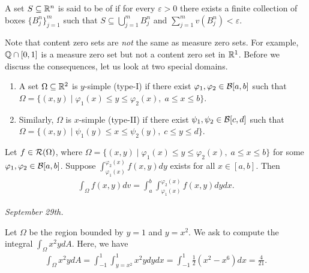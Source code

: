 \begin{definition}
    A set $S \subseteq \mathbb{R}^{n}$ is said to be of  if for every $\varepsilon > 0$ there exists a finite collection of boxes $\{B_{j}^{n}\}_{j = 1}^{m}$ such that $S \subseteq \bigcup_{j=1}^{m} B_{j}^{n}$ and $\sum_{j=1}^{m} v(B_{j}^{n}) < \varepsilon$.
\end{definition}

Note that content zero sets are \textit{not} the same as measure zero sets. For example, $\mathbb{Q} \cap [0,1]$ is a measure zero set but not a content zero set in $\mathbb{R}^{1}$. Before we discuss the consequences, let us look at two special domains.

\begin{enumerate}
    \item A set $\Omega \subseteq \mathbb{R}^{2}$ is $y$-simple (type-I) if there exist $\varphi_{1},\varphi_{2} \in \mathcal{B}[a,b]$ such that $\Omega = \{(x,y) \mid \varphi_{1}(x) \leq y \leq \varphi_{2}(x),\; a \leq x \leq b\}$. 
    \item Similarly, $\Omega$ is $x$-simple (type-II) if there exist $\psi_{1},\psi_{2} \in \mathcal{B}[c,d]$ such that $\Omega = \{(x,y) \mid \psi_{1}(y) \leq x \leq \psi_{2}(y),\; c \leq y \leq d\}$.
\end{enumerate}

\begin{theorem}
    Let $f \in \mathcal{R}(\Omega)$, where $\Omega = \{(x,y) \mid \varphi_{1}(x) \leq y \leq \varphi_{2}(x),\;a \leq x \leq b\}$ for some $\varphi_{1},\varphi_{2} \in \mathcal{B}[a,b]$. Suppose $\int_{\varphi_{1}(x)}^{\varphi_{2}(x)} f(x,y) dy$ exists for all $x \in [a,b]$. Then
    \begin{align}
        \int_{\Omega} f(x,y) dv = \int_{a}^{b} \int_{\varphi_{1}(x)}^{\varphi_{2}(x)} f(x,y) dy dx.
    \end{align}
\end{theorem}

\textit{September 29th.}

\begin{example}
    Let $\Omega$ be the region bounded by $y = 1$ and $y = x^{2}$. We ask to compute the integral $\int_{\Omega} x^{2}y dA$. Here, we have
    \begin{align}
        \int_{\Omega} x^{2}y dA = \int_{-1}^{1} \int_{y=x^{2}}^{1} x^{2}y dy dx = \int_{-1}^{1} \frac{1}{2}(x^{2}-x^{6}) dx = \frac{4}{21}.
    \end{align}
\end{example}

